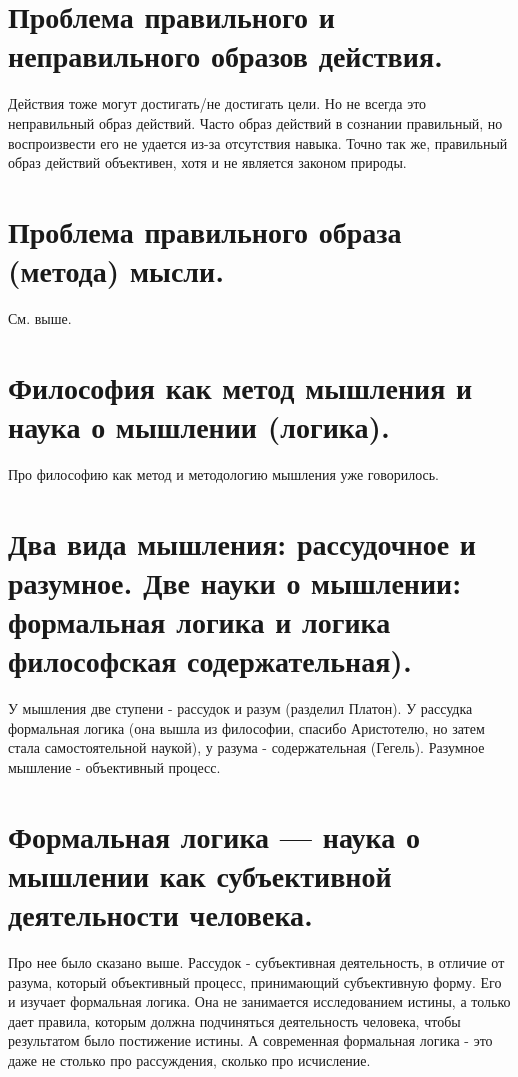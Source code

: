 \section{ Проблема правильного и неправильного образов действия.}
Действия тоже могут достигать/не достигать цели. Но не всегда это неправильный образ действий. Часто образ действий в сознании правильный, но воспроизвести его не удается из-за отсутствия навыка. Точно так же, правильный образ действий объективен, хотя и не является законом природы. 

\section{ Проблема правильного образа (метода) мысли.}
См. выше.

\section{ Философия как метод мышления и наука о мышлении (логика).}
Про философию как метод и методологию мышления уже говорилось. 

\section{ Два вида мышления: рассудочное и разумное. Две науки о мышлении: формальная логика и логика философская содержательная).}
У мышления две ступени - рассудок и разум (разделил Платон). У рассудка формальная логика (она вышла из философии, спасибо Аристотелю, но затем стала самостоятельной наукой), у разума - содержательная (Гегель). Разумное мышление - объективный процесс.

\section{ Формальная логика — наука о мышлении как субъективной деятельности человека.}
Про нее было сказано выше. Рассудок - субъективная деятельность, в отличие от разума, который объективный процесс, принимающий субъективную форму. Его и изучает формальная логика. Она не занимается исследованием истины, а только дает правила, которым должна подчиняться деятельность человека, чтобы результатом было постижение истины. А современная формальная логика - это даже не столько про рассуждения, сколько про исчисление.


